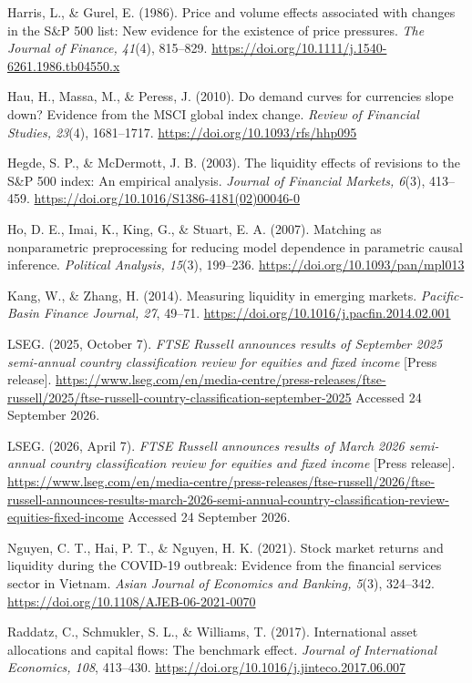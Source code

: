 \documentclass[review,authoryear,12pt]{elsarticle}
\begin{document}
Harris, L., \& Gurel, E. (1986). Price and volume effects associated
with changes in the S\&P 500 list: New evidence for the existence of
price pressures. \emph{The Journal of Finance, 41}(4), 815--829.
\url{https://doi.org/10.1111/j.1540-6261.1986.tb04550.x}

Hau, H., Massa, M., \& Peress, J. (2010). Do demand curves for
currencies slope down? Evidence from the MSCI global index change.
\emph{Review of Financial Studies, 23}(4), 1681--1717.
\url{https://doi.org/10.1093/rfs/hhp095}

Hegde, S. P., \& McDermott, J. B. (2003). The liquidity effects of
revisions to the S\&P 500 index: An empirical analysis. \emph{Journal of
Financial Markets, 6}(3), 413--459.
\url{https://doi.org/10.1016/S1386-4181(02)00046-0}

Ho, D. E., Imai, K., King, G., \& Stuart, E. A. (2007). Matching as
nonparametric preprocessing for reducing model dependence in parametric
causal inference. \emph{Political Analysis, 15}(3), 199--236.
\url{https://doi.org/10.1093/pan/mpl013}

Kang, W., \& Zhang, H. (2014). Measuring liquidity in emerging markets.
\emph{Pacific-Basin Finance Journal, 27}, 49--71.
\url{https://doi.org/10.1016/j.pacfin.2014.02.001}

LSEG. (2025, October 7). \emph{FTSE Russell announces results of
September 2025 semi-annual country classification review for equities
and fixed income} {[}Press release{]}.
\url{https://www.lseg.com/en/media-centre/press-releases/ftse-russell/2025/ftse-russell-country-classification-september-2025}
Accessed 24 September 2026.

LSEG. (2026, April 7). \emph{FTSE Russell announces results of March
2026 semi-annual country classification review for equities and fixed
income} {[}Press release{]}.
\url{https://www.lseg.com/en/media-centre/press-releases/ftse-russell/2026/ftse-russell-announces-results-march-2026-semi-annual-country-classification-review-equities-fixed-income}
Accessed 24 September 2026.

Nguyen, C. T., Hai, P. T., \& Nguyen, H. K. (2021). Stock market returns
and liquidity during the COVID-19 outbreak: Evidence from the financial
services sector in Vietnam. \emph{Asian Journal of Economics and
Banking, 5}(3), 324--342. \url{https://doi.org/10.1108/AJEB-06-2021-0070}

Raddatz, C., Schmukler, S. L., \& Williams, T. (2017). International
asset allocations and capital flows: The benchmark effect. \emph{Journal
of International Economics, 108}, 413--430.
\url{https://doi.org/10.1016/j.jinteco.2017.06.007}
\end{document}
